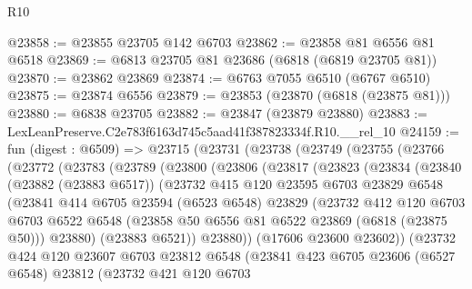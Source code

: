\begin{lexlean}{R10}
\begin{coremodule}
@23858 := @23855 @23705 @142 @6703
@23862 := @23858 @81 @6556 @81 @6518
@23869 := @6813 @23705 @81 @23686 (@6818 (@6819 @23705 @81))
@23870 := @23862 @23869
@23874 := @6763 @7055 @6510 (@6767 @6510)
@23875 := @23874 @6556
@23879 := @23853 (@23870 (@6818 (@23875 @81)))
@23880 := @6838 @23705
@23882 := @23847 (@23879 @23880)
@23883 := LexLeanPreserve.C2e783f6163d745c5aad41f387823334f.R10.__rel_10
@24159 := fun (digest : @6509) =>
  @23715
    (@23731
      (@23738
        (@23749
          (@23755
            (@23766
              (@23772
                (@23783
                  (@23789
                    (@23800
                      (@23806
                        (@23817
                          (@23823
                            (@23834
                              (@23840
                                (@23882 (@23883 @6517))
                                (@23732
                                  @415
                                  @120
                                  @23595
                                  @6703
                                  @23829
                                  @6548
                                  (@23841
                                    @414
                                    @6705
                                    @23594
                                    (@6523 @6548)
                                    @23829
                                    (@23732
                                      @412
                                      @120
                                      @6703
                                      @6703
                                      @6522
                                      @6548
                                      (@23858 @50 @6556 @81 @6522 @23869 (@6818 (@23875 @50)))
                                      @23880)
                                    (@23883 @6521))
                                  @23880))
                              (@17606 @23600 @23602))
                            (@23732
                              @424
                              @120
                              @23607
                              @6703
                              @23812
                              @6548
                              (@23841
                                @423
                                @6705
                                @23606
                                (@6527 @6548)
                                @23812
                                (@23732
                                  @421
                                  @120
                                  @6703

\end{coremodule}
\end{lexlean}

